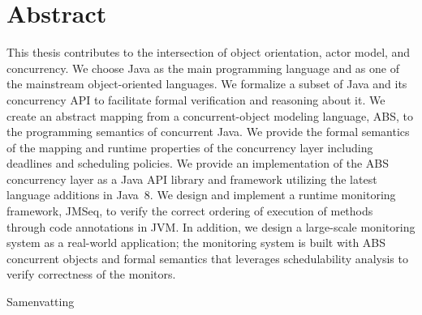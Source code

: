 %
\chapter*{Abstract}
\label{sec:abstract}
\vspace*{-10mm}

This thesis contributes to the intersection of object orientation, actor model, and concurrency.
We choose Java as the main programming language and as one of the mainstream 
object-oriented languages. 
We formalize a subset of Java and its concurrency API to 
facilitate formal verification and reasoning about it.
We create an abstract mapping from a concurrent-object modeling language, 
ABS, to the programming semantics of concurrent Java. 
We provide the formal semantics of the mapping and runtime properties of 
the concurrency layer including deadlines and scheduling policies.
We provide an implementation of the ABS concurrency layer as a Java API library 
and framework utilizing the latest language additions 
in Java~8.
We design and implement a runtime monitoring framework, JMSeq, to verify the
correct ordering of execution of methods through code annotations in JVM. 
In addition, we design a large-scale monitoring system as a real-world 
application; the monitoring system is built with ABS concurrent objects 
and formal semantics that leverages schedulability 
analysis to verify correctness of the monitors.

\vspace*{20mm}

{Samenvatting}\label{sec:abstract-diff} \\


